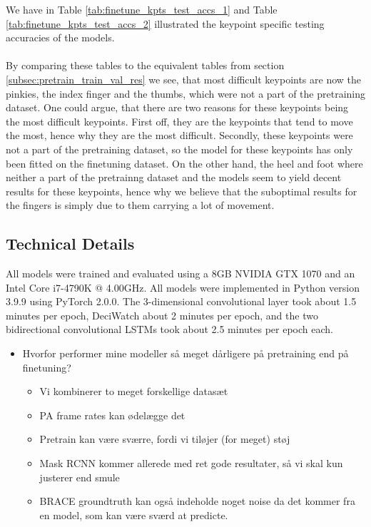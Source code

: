 \documentclass[./main.tex]{subfiles}
\begin{document}
\noindent We have in Table \ref{tab:finetune_kpts_test_accs_1} and Table \ref{tab:finetune_kpts_test_accs_2} illustrated the keypoint specific testing accuracies of the models. 
\\
\\
By comparing these tables to the equivalent tables from section \ref{subsec:pretrain_train_val_res} we see, that most difficult keypoints are now the pinkies, the index finger and the thumbs, which were not a part of the pretraining dataset. One could argue, that there are two reasons for these keypoints being the most difficult keypoints. First off, they are the keypoints that tend to move the most, hence why they are the most difficult. Secondly, these keypoints were not a part of the pretraining dataset, so the model for these keypoints has only been fitted on the finetuning dataset. On the other hand, the heel and foot where neither a part of the pretrainng dataset and the models seem to yield decent results for these keypoints, hence why we believe that the suboptimal results for the fingers is simply due to them carrying a lot of movement.

\subsection{Technical Details}
All models were trained and evaluated using a 8GB NVIDIA GTX 1070 and an Intel Core i7-4790K @ 4.00GHz. All models were implemented in Python version 3.9.9 using PyTorch 2.0.0. The 3-dimensional convolutional layer took about 1.5 minutes per epoch, DeciWatch about 2 minutes per epoch, and the two bidirectional convolutional LSTMs took about 2.5 minutes per epoch each.

\begin{itemize}
    \item Hvorfor performer mine modeller så meget dårligere på pretraining end på finetuning?
    \begin{itemize}
        \item Vi kombinerer to meget forskellige datasæt
        \item PA frame rates kan ødelægge det
        \item Pretrain kan være sværre, fordi vi tiløjer (for meget) støj
        \item Mask RCNN kommer allerede med ret gode resultater, så vi skal kun justerer end smule
        \item BRACE groundtruth kan også indeholde noget noise da det kommer fra en model, som kan være sværd at predicte.
    \end{itemize}
\end{itemize}
\end{document}

